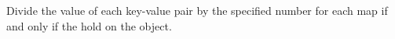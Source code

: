 Divide the value of each key-value pair by the specified number for each map if
and only if the  hold on the object.



